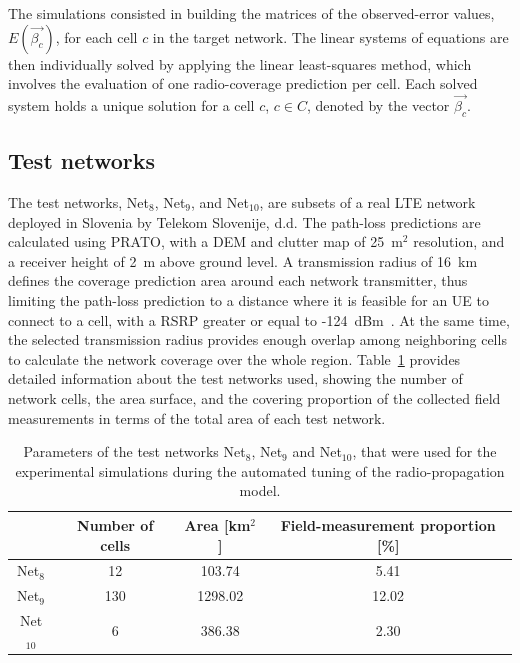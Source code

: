 The simulations consisted in building the matrices of the observed-error
values, $E(\vec{\beta_{c}})$, for each cell $c$ in the target network.
The linear systems of equations are then individually solved by applying
the linear least-squares method, which involves the evaluation of
one radio-coverage prediction per cell. Each solved system holds a
unique solution for a cell $c$, $c\in C$, denoted by the vector
$\vec{\beta_{c}}$.


\subsection{Test networks \label{sub:05-Test_networks}}

The test networks, Net$_{8}$, Net$_{9}$, and Net$_{10}$, are subsets
of a real LTE network deployed in Slovenia by Telekom Slovenije, d.d.
The path-loss predictions are calculated using PRATO, with a DEM and
clutter map of 25~m$^{2}$ resolution, and a receiver height of 2~m
above ground level. A transmission radius of 16~km defines the coverage
prediction area around each network transmitter, thus limiting the
path-loss prediction to a distance where it is feasible for an UE
to connect to a cell, with a RSRP greater or equal to -124~dBm~\cite{Neuland_Influence_of_Different_Factors_on_X_Map_Estimation_in_LTE:2011}.
At the same time, the selected transmission radius provides enough
overlap among neighboring cells to calculate the network coverage
over the whole region. Table~\ref{tab:05-Test_network_properties}
provides detailed information about the test networks used, showing
the number of network cells, the area surface, and the covering proportion
of the collected field measurements in terms of the total area of
each test network.

\begin{table}
\centering

\caption{Parameters of the test networks Net$_{8}$, Net$_{9}$ and Net$_{10}$,
that were used for the experimental simulations during the automated
tuning of the radio-propagation model.\label{tab:05-Test_network_properties}}


\begin{tabular}{cccc}
\cline{2-4} 
 & Number of cells  & Area {[}km$^{2}${]} & Field-measurement proportion {[}\%{]}\tabularnewline
\hline 
Net$_{8}$  & 12 & 103.74 & 5.41\tabularnewline
Net$_{9}$  & 130  & 1298.02 & 12.02\tabularnewline
Net$_{10}$  & 6  & 386.38 & 2.30\tabularnewline
\hline 
\end{tabular}
\end{table}


